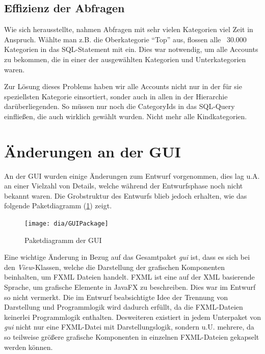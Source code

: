 \subsection{Effizienz der Abfragen}
Wie sich herausstellte, nahmen Abfragen mit sehr vielen Kategorien viel Zeit in Anspruch. Wählte man z.B. die Oberkategorie "`Top"' aus, flossen alle ~30.000 Kategorien in das SQL-Statement mit ein. Dies war notwendig, um alle Accounts zu bekommen, die in einer der ausgewählten Kategorien und Unterkategorien waren.

Zur Lösung dieses Problems haben wir alle Accounts nicht nur in der für sie speziellsten Kategorie einsortiert, sonder auch in allen in der Hierarchie darüberliegenden. So müssen nur noch die CategoryIds in das SQL-Query einfließen, die auch wirklich gewählt wurden. Nicht mehr alle Kindkategorien.

\section{Änderungen an der GUI}
An der GUI wurden einige Änderungen zum Entwurf vorgenommen, dies lag u.A. an einer Vielzahl von Details, welche während der Entwurfsphase noch nicht bekannt waren. 
Die Grobstruktur des Entwurfs blieb jedoch erhalten, wie das folgende Paketdiagramm (\ref{fig:GUI}) zeigt.
\begin{figure}[H]
	\centering
	\texttt{[image: dia/GUIPackage]}
	\caption{Paketdiagramm der GUI}
	\label{fig:GUI}
\end{figure}

Eine wichtige Änderung in Bezug auf das Gesamtpaket \emph{gui} ist, dass es sich bei den \emph{View}-Klassen, welche die Darstellung der grafischen Komponenten beinhalten, um FXML Dateien handelt. FXML ist eine auf der  XML basierende Sprache, um grafische Elemente in JavaFX zu beschreiben. Dies war im Entwurf so nicht vermerkt. Die im Entwurf beabsichtigte Idee der Trennung von Darstellung und Programmlogik wird dadurch erfüllt, da die FXML-Dateien keinerlei Programmlogik enthalten. Desweiteren existiert in jedem Unterpaket von \emph{gui} nicht nur eine FXML-Datei mit Darstellungslogik, sondern u.U. mehrere, da so teilweise größere grafische Komponenten in einzelnen FXML-Dateien gekapselt werden können.

